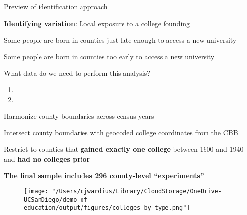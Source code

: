 \documentclass[notes,11pt, aspectratio=169]{beamer}
\newenvironment{wideitemize}{\itemize\addtolength{\itemsep}{10pt}}{\enditemize}
\begin{document}
\begin{frame}{Preview of identification approach}
  \begin{wideitemize}
    \item \textbf{Identifying variation}: Local exposure to a college founding
    \item Some people are born in counties just late enough to access a new university
    \item Some people are born in counties too early to access a new university
  \end{wideitemize}
\end{frame}

\begin{frame}{What data do we need to perform this analysis?}
  \begin{enumerate}
    \item {}
    \vspace{2cm}
    \item {}
  \end{enumerate}
\end{frame}

\begin{frame}[label=isolating]{\color{orange}{Identifying counties that experienced a college expansion}}
  \begin{wideitemize}
    \item Harmonize county boundaries across census years
    \item Intersect county boundaries with geocoded college coordinates from the CBB
    \item Restrict to counties that \textbf{gained exactly one college} between 1900 and 1940 and \textbf{had no colleges prior}
    \item \textbf{The final sample includes 296 county-level ``experiments''}
  \end{wideitemize}
  \vspace{1em}
  \centering
  \hyperlink{spatialstability}{} \quad
  \hyperlink{countycrosswalk}{}
\end{frame}

\begin{frame}{\color{orange}{New college types}}
  \begin{figure}
        \centering
        \texttt{[image: "/Users/cjwardius/Library/CloudStorage/OneDrive-UCSanDiego/demo of education/output/figures/colleges\_by\_type.png"]}
    \end{figure}
\end{frame}
\end{document}
